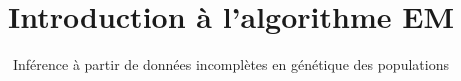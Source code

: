 \documentclass{novel}
\title     {Introduction à l'algorithme EM}
\subtitle  {Inférence à partir de données incomplètes en génétique des populations}
\numberwithin{equation}{chapter}
\theoremstyle{definition}
\theoremstyle{plain}
\theoremstyle{remark}
\theoremstyle{proof}
\begin{document}
\toc


\end{document}
